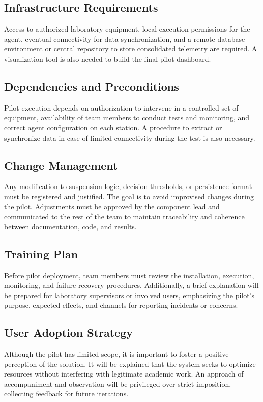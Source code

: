 \documentclass[12pt,a4paper]{article}
\begin{document}
\subsection{Infrastructure Requirements}
Access to authorized laboratory equipment, local execution permissions for the agent, eventual connectivity for data synchronization, and a remote database environment or central repository to store consolidated telemetry are required. A visualization tool is also needed to build the final pilot dashboard.

\subsection{Dependencies and Preconditions}
Pilot execution depends on authorization to intervene in a controlled set of equipment, availability of team members to conduct tests and monitoring, and correct agent configuration on each station. A procedure to extract or synchronize data in case of limited connectivity during the test is also necessary.

\subsection{Change Management}
Any modification to suspension logic, decision thresholds, or persistence format must be registered and justified. The goal is to avoid improvised changes during the pilot. Adjustments must be approved by the component lead and communicated to the rest of the team to maintain traceability and coherence between documentation, code, and results.

\subsection{Training Plan}
Before pilot deployment, team members must review the installation, execution, monitoring, and failure recovery procedures. Additionally, a brief explanation will be prepared for laboratory supervisors or involved users, emphasizing the pilot's purpose, expected effects, and channels for reporting incidents or concerns.

\subsection{User Adoption Strategy}
Although the pilot has limited scope, it is important to foster a positive perception of the solution. It will be explained that the system seeks to optimize resources without interfering with legitimate academic work. An approach of accompaniment and observation will be privileged over strict imposition, collecting feedback for future iterations.
\end{document}
